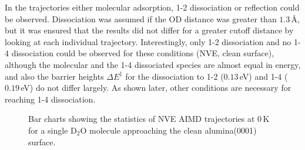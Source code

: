 \documentclass[11pt,DIV=13,BCOR=5mm,a4paper,headinclude]{scrbook}
\begin{document}
In the trajectories  either molecular adsorption, 1-2 dissociation or reflection could be observed.
Dissociation was assumed if the OD distance was greater than $1.3\,$\AA{}, but it was ensured that the results did not differ for a greater cutoff distance by looking at each individual trajectory.
Interestingly, only 1-2 dissociation and no 1-4 dissociation could be observed for these conditions (NVE, clean surface), although the molecular and the 1-4 dissociated species are almost equal in energy, and also the barrier heights $\Delta E^\ddagger$ for the dissociation to 1-2 ($0.13\,$eV) and 1-4 ($0.19\,$eV) do not differ largely\cite{WirthJPCC2012}. %
As shown later, other conditions are necessary for reaching 1-4 dissociation.
\\
  \begin{figure}[!h]
\centering
 \quad
 \quad
\caption{Bar charts showing the statistics of NVE AIMD trajectories at $0\,$K for a single D$_2$O molecule approaching the clean alumina(0001) surface.
}
\end{figure}
\end{document}
